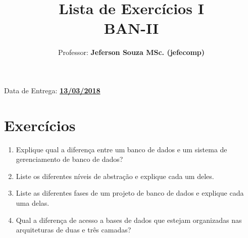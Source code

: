 \documentclass[12pt]{article}
\title{Lista de Exercícios I\\
BAN-II}
\author{Professor: \textbf{Jeferson Souza MSc. (jefecomp)}}
\begin{document}
\date{}

\maketitle

\begin{center}
Data de Entrega: \textbf{\underline{13/03/2018}}
\end{center}

\section*{Exercícios}

\begin{enumerate}
\itemsep 10mm

\item Explique qual a diferença entre um banco de dados e um sistema de gerenciamento de banco de dados?

\item Liste os diferentes níveis de abstração e explique cada um deles.

\item Liste as diferentes fases de um projeto de banco de dados e explique cada uma delas.

\item Qual a diferença de acesso a bases de dados que estejam organizadas nas arquiteturas de duas e três camadas?

\end{enumerate}
\end{document}
